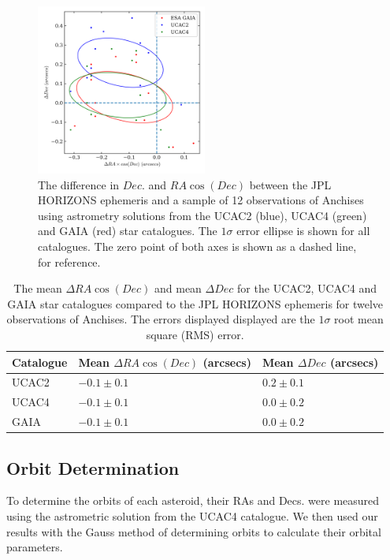 \documentclass[10pt, twocolumn]{revtex4}    %
\begin{document}
\begin{figure}[h!]
\centering
\includegraphics[width=0.5\textwidth]{20180424_174110_ASTROM_COMPARE}
\caption{The difference in $Dec.$ and $RA\cos(Dec)$ between the JPL HORIZONS ephemeris and a sample of 12 observations of Anchises using astrometry solutions from the UCAC2 (blue), UCAC4 (green) and GAIA (red) star catalogues. The $1\sigma$ error ellipse is shown for all catalogues. The zero point of both axes is shown as a dashed line, for reference.}
\label{fig: astrom compare}
\end{figure}

\begin{table}[h!]
\centering
\begin{tabularx}{0.5\textwidth}{ Y Y Y }
\hhline{===}
Catalogue & Mean $\Delta RA \cos (Dec)$ (arcsecs) & Mean $\Delta Dec$ (arcsecs) \\[3pt] \hline
UCAC2 & $-0.1 \pm 0.1$ & $0.2 \pm 0.1$ \\[3pt]
UCAC4 & $-0.1 \pm 0.1$ & $0.0 \pm 0.2$ \\[3pt]
GAIA & $-0.1 \pm 0.1$ & $0.0 \pm 0.2$ \\[3pt] \hline
\end{tabularx}
\caption{The mean $\Delta RA \cos (Dec)$ and mean $\Delta Dec$ for the UCAC2, UCAC4 and GAIA star catalogues compared to the JPL HORIZONS ephemeris for twelve observations of Anchises. The errors displayed displayed are the $1\sigma$ root mean square (RMS) error.}
\label{tab: astrom compare results}
\end{table}


\subsection*{Orbit Determination}

To determine the orbits of each asteroid, their RAs and Decs. were measured using the astrometric solution from the UCAC4 catalogue. We then used our results with the Gauss method of determining orbits to calculate their orbital parameters.
\end{document}

